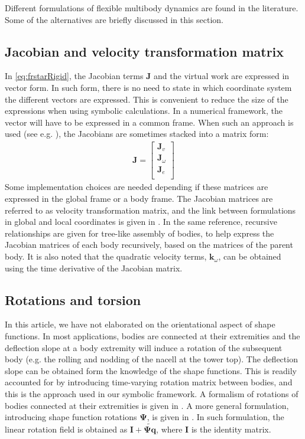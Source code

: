 \documentclass[wes, manuscript]{copernicus}
\renewcommand{\v}[1]{\boldsymbol{#1}}
\newcommand{\m}[1]{\boldsymbol{#1}}
\begin{document}
Different formulations of flexible multibody dynamics are found in the literature.
Some of the alternatives are briefly discussed in this section.


\subsection{Jacobian and velocity transformation matrix}
In \autoref{eq:frstarRigid}, the Jacobian terms $\v{J}$ and the virtual work are expressed in vector form.
In such form, there is no need to state in which coordinate system the different vectors are expressed.
This is convenient to reduce the size of the expressions when using symbolic calculations.
In a numerical framework, the vector will have to be expressed in a common frame.
When such an approach is used (see e.g. \cite{Lemmer:2018, branlard:2019flex}), the Jacobians are sometimes stacked into a matrix form:
\begin{align}
\m{J} = 
    \begin{bmatrix}
    \v{J}_v \\
    \v{J}_\omega\\
    \v{J}_e \\
    \end{bmatrix}
\end{align}
Some implementation choices are needed depending if these matrices are expressed in the global frame or a body frame.
    The Jacobian matrices are referred to as velocity transformation matrix, and the link between formulations in global and local coordinates is given in \cite{branlard:2019flex}.
    In the same reference, recursive relationships are given for tree-like assembly of bodies, to help express the Jacobian matrices of each body recursively, based on the matrices of the parent body.
    It is also noted that the quadratic velocity terms, $\v{k}_\omega$, can be obtained using the time derivative of the Jacobian matrix.

\subsection{Rotations and torsion}
In this article, we have not elaborated on the orientational aspect of shape functions.
In most applications, bodies are connected at their extremities and the deflection slope at a body extremity will induce a rotation of the subsequent body (e.g. the rolling and nodding of the nacell at the tower top).
The deflection slope can be obtained form the knowledge of the shape functions.
This is readily accounted for by introducing time-varying rotation matrix between bodies, and this is the approach used in our symbolic framework.
A formalism of rotations of bodies connected at their extremities is given in \cite{branlard:2019flex}.
A more general formulation, introducing shape function rotations $\m{\Psi}$, is given in \citep{Wallrapp:1994, Schwertassek:book, Lemmer:2018}.
In such formulation, the linear rotation field is obtained as $\m{I}+\m{\widetilde{\m{\Psi}\v{q}}}$, where $\m{I}$ is the identity matrix.
\end{document}
